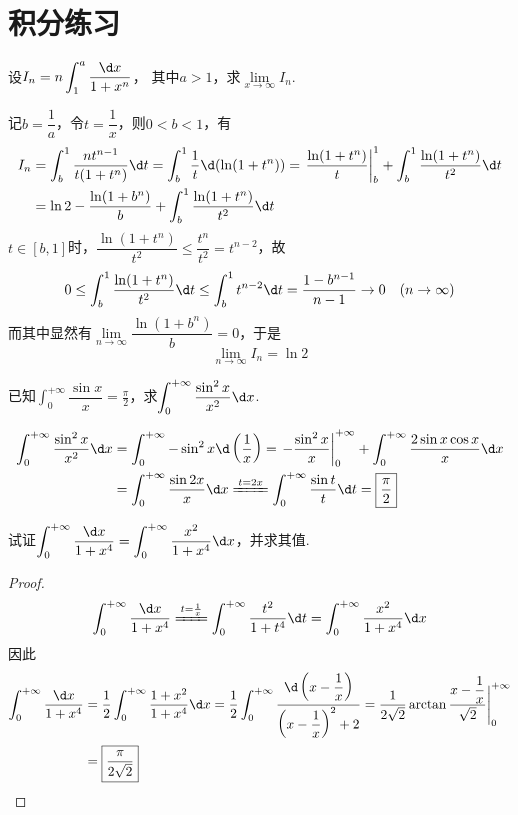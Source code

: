 \documentclass[12pt, a4paper, oneside, UTF8]{ctexbook}
\begin{document}
\section{积分练习}
\begin{exercise}
    设$I_n = n\displaystyle\int_{1}^{a}\dfrac{\d x}{1+x^n}$，
    其中$a>1$，求$\lim\limits_{x \to \infty}I_n$.
\end{exercise}
\begin{solution}
    记$b=\dfrac{1}{a}$，令$t=\dfrac{1}{x}$，则$0<b<1$，有
    \begin{align*}
        I_n &= \int_{b}^{1} \dfrac{nt^{n-1}}{t(1+t^n)} \d t
        =\int_{b}^{1} \dfrac{1}{t}\d (\ln(1+t^n))
        =\left.\dfrac{\ln(1+t^n)}{t}\right|_{b}^{1}+\int_{b}^{1} \dfrac{\ln(1+t^n)}{t^2} \d t\\
        &=\ln 2 - \dfrac{\ln(1+b^n)}{b} + \int_{b}^{1} \dfrac{\ln(1+t^n)}{t^2} \d t
    \end{align*}
    $t \in [b,1]$时，$\dfrac{\ln(1+t^n)}{t^2} \le \dfrac{t^n}{t^2} = t^{n-2}$，故
    \[
        0 \le \int_{b}^{1}\dfrac{\ln(1+t^n)}{t^2} \d t \le \int_{b}^{1} t^{n-2} \d t = \dfrac{1-b^{n-1}}{n-1} \to 0\quad (n \to \infty)
    \]
    而其中显然有$\lim\limits_{n \to \infty} \dfrac{\ln(1+b^n)}{b} = 0$，于是
    \[
        \lim_{n \to \infty} I_n = \boxed{\ln 2}
    \]
\end{solution}
\begin{exercise}
    已知$\displaystyle\int_{0}^{+\infty} \dfrac{\sin x}{x}= \frac{\pi}{2}$，求$\displaystyle\int_{0}^{+\infty} \dfrac{\sin^2 x}{x^2} \d x$.
\end{exercise}
\begin{solution}
    \begin{align*}
        \int_{0}^{+\infty} \dfrac{\sin^2 x}{x^2} \d x
        &=\int_{0}^{+\infty} -\sin^2 x \d \left( \dfrac{1}{x} \right)
        =\left. -\dfrac{\sin^2 x}{x} \right|_{0}^{+\infty} + \int_{0}^{+\infty} \dfrac{2\sin x \cos x}{x} \d x\\
        &=\int_{0}^{+\infty} \dfrac{\sin 2x}{x} \d x
        \xlongequal{t=2x} \int_{0}^{+\infty} \dfrac{\sin t}{t} \d t = \boxed{\dfrac{\pi}{2}}
    \end{align*}
\end{solution}
\begin{exercise}
    试证$\displaystyle\int_{0}^{+\infty} \dfrac{\d x}{1+x^4} = \displaystyle\int_{0}^{+\infty} \dfrac{x^2}{1+x^4} \d x$，并求其值.
\end{exercise}
\begin{proof}
    \[
        \int_{0}^{+\infty} \dfrac{\d x}{1+x^4}
        \xlongequal{t = \frac{1}{x}}\int_{0}^{+\infty} \dfrac{t^2}{1+t^4} \d t
        =\int_{0}^{+\infty} \dfrac{x^2}{1+x^4} \d x
    \]  
    因此
    \begin{align*}
        \int_{0}^{+\infty} \dfrac{\d x}{1+x^4}
        &= \dfrac{1}{2} \int_{0}^{+\infty} \dfrac{1+x^2}{1+x^4} \d x
        =\dfrac{1}{2} \int_{0}^{+\infty} \dfrac{\d \left(x - \dfrac{1}{x}\right)}{\left(x - \dfrac{1}{x}\right)^2 + 2}
        =\dfrac{1}{2\sqrt{2}} \arctan \dfrac{x - \dfrac{1}{x}}{\sqrt{2}} \Bigg|_{0}^{+\infty}\\
        &=\boxed{\dfrac{\pi}{2\sqrt{2}}}
    \end{align*}
\end{proof}
\end{document}
